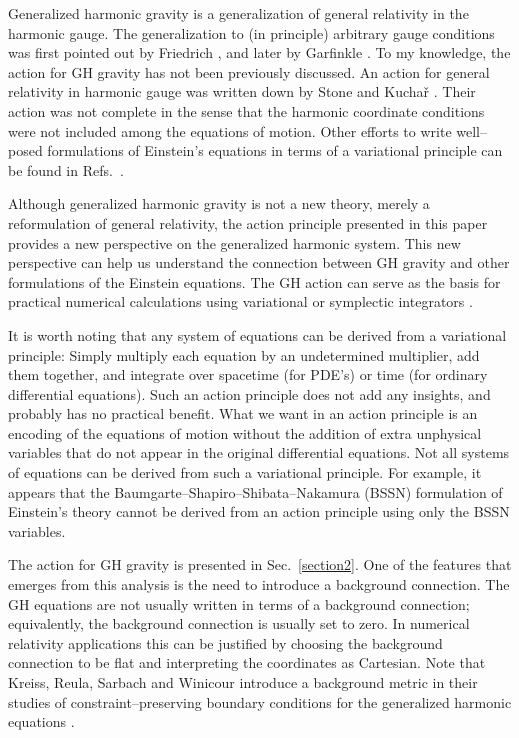 \documentclass[letterpaper,nofootinbib,prd,amsmath,twocolumn]{revtex4-1}
\begin{document}
Generalized harmonic gravity is a generalization of general relativity in the harmonic gauge. 
The generalization to (in principle) arbitrary gauge conditions was first pointed out by Friedrich 
\cite{Friedrich:GH}, and later by Garfinkle \cite{Garfinkle:2001ni}. To my knowledge, the action for 
GH gravity has not been previously discussed. An action for general relativity in harmonic gauge was written 
down by Stone and Kucha{\v r} \cite{Stone:1992nz}. Their action was not complete in the sense that the 
harmonic coordinate conditions were not included among the equations of motion. Other efforts to write 
well--posed formulations of Einstein's equations in terms of a variational principle can be found 
in Refs.~\cite{Brown:2008cca,Hilditch:2010wp,Bona:2010is}. 

Although generalized harmonic gravity is not a new theory, merely a reformulation of general relativity, the 
action principle presented in this paper provides 
a new perspective on the generalized harmonic system. This new perspective can help us understand the connection 
between GH gravity and other formulations of the Einstein equations. 
The GH action can serve as the basis for practical numerical calculations using variational or symplectic
integrators \cite{Brown:2005jc,Frauendiener:2008bt,Richter:2009ff}. 

It is worth noting that any system of equations can be derived from a variational principle: Simply multiply each equation 
by an undetermined multiplier, add them together, and integrate over spacetime (for PDE's) or time 
(for ordinary differential equations). 
Such an action principle does not add any insights, and probably has no practical benefit. 
What we want in an action principle is an encoding of the equations of motion without the addition of 
extra unphysical variables that do not appear in the original differential equations. 
Not all systems of equations can be derived from such a variational principle. For example, it appears that the 
Baumgarte--Shapiro--Shibata--Nakamura (BSSN) formulation 
of Einstein's theory \cite{Shibata:1995we,Baumgarte:1998te} cannot be derived from an action principle 
using only the BSSN variables. 

The action for GH gravity is presented in Sec.~\ref{section2}. 
One of the features that emerges from this analysis is the need to introduce a background connection. The GH equations 
are not usually written in terms of a background connection; equivalently, the background connection is usually 
set to zero. In numerical relativity applications this can be justified by choosing the background connection to be flat and 
interpreting the coordinates as Cartesian. Note that Kreiss, Reula, Sarbach and Winicour introduce a background 
metric in their studies of constraint--preserving boundary conditions for the generalized harmonic equations 
\cite{Kreiss:2008ig,Winicour:2009dr}. 
\end{document}
